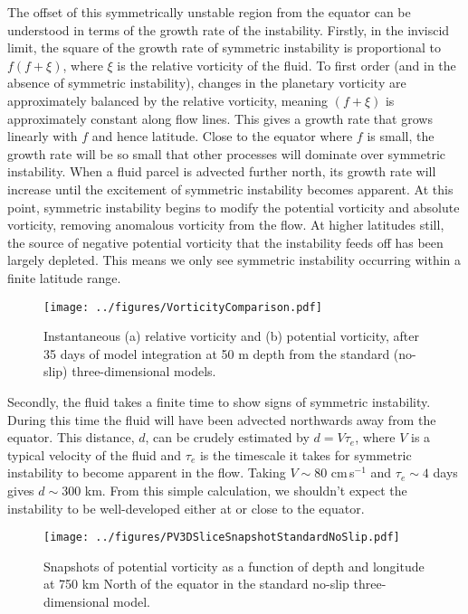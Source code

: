 The offset of this symmetrically unstable region from the equator can be understood in terms of the growth rate of the instability. Firstly, in the inviscid limit, the square of the growth rate of symmetric instability is proportional to $f(f + \xi)$, where $\xi$ is the relative vorticity of the fluid. To first order (and in the absence of symmetric instability), changes in the planetary vorticity are approximately balanced by the relative vorticity, meaning $(f + \xi)$ is approximately constant along flow lines. This gives a growth rate that grows linearly with $f$ and hence latitude. Close to the equator where $f$ is small, the growth rate will be so small that other processes will dominate over symmetric instability. When a fluid parcel is advected further north, its growth rate will increase until the excitement of symmetric instability becomes apparent. At this point, symmetric instability begins to modify the potential vorticity and absolute vorticity, removing anomalous vorticity from the flow. At higher latitudes still, the source of negative potential vorticity that the instability feeds off has been largely depleted. This means we only see symmetric instability occurring within a finite latitude range.

\begin{figure}[p]
    \centering
    \texttt{[image: ../figures/VorticityComparison.pdf]}
    \caption{Instantaneous (a) relative vorticity and (b) potential vorticity, after 35 days of model integration at 50 m depth from the standard (no-slip) three-dimensional models.}
    \label{fig:EddyRelativeAndAbsoluteVorticity}
\end{figure}

Secondly, the fluid takes a finite time to show signs of symmetric instability. During this time the fluid will have been advected northwards away from the equator. This distance, $d$, can be crudely estimated by $d = V \tau_e$, where $V$ is a typical velocity of the fluid and $\tau_e$ is the timescale it takes for symmetric instability to become apparent in the flow. Taking $V\sim 80$ cm\,s$^{-1}$ and $\tau_e \sim 4$ days gives $d \sim 300$ km. From this simple calculation, we shouldn't expect the instability to be well-developed either at or close to the equator.


\begin{figure}[t]
    \centering
    \texttt{[image: ../figures/PV3DSliceSnapshotStandardNoSlip.pdf]}
    \caption{Snapshots of potential vorticity as a function of depth and longitude at 750 km  North of the equator in the standard no-slip three-dimensional model.}
    \label{fig:PVatFixedLatStandardNoSlip3D}
\end{figure}

